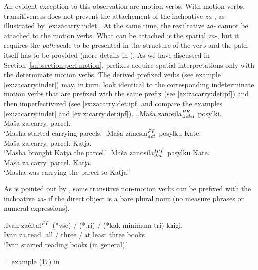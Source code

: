 An evident exception to this observation are motion verbs. With motion verbs, transitiveness does not prevent the attachement of the inchoative \textit{za-}, as illustrated by \ref{ex:zacarry:indet}. At the same time, the resultative \textit{za-} cannot be attached to the motion verbs. What can be attached is the spatial \textit{za-}, but it requires the \textit{path} scale to be presented in the structure of the verb and the path itself has to be provided (more details in \citealt{ZinovaOsswald:paper}). As we have discussed in Section~\ref{subsection:perf:motion}, prefixes acquire spatial interpretations only with the determinate motion verbs. The derived prefixed verbs (see example \ref{ex:zacarry:indet}) may, in turn, look identical to the corresponding indeterminate motion verbs that are prefixed with the same prefix (see \ref{ex:zacarry:det:pf}) and then imperfectivized (see \ref{ex:zacarry:det:ipf} and compare the examples \ref{ex:zacarry:indet} and \ref{ex:zacarry:det:ipf}).
 \ex.\label{ex:zacarry}\ag.\label{ex:zacarry:indet}Ma\v{s}a zanosila$^{\mathit{PF}}_{\mathit{indet}}$ posylki.\\
 Ma\v{s}a za.carry. parcel.\\
 \vspace{0.5em}
`Masha started carrying parcels.'
\bg.\label{ex:zacarry:det:pf}Ma\v{s}a zanesla$^{\mathit{PF}}_{\mathit{det}}$ posylku Kate.\\
 Ma\v{s}a za.carry. parcel. Katja.\\
 \vspace{0.5em}
`Masha brought Katja the parcel.'
\bg.\label{ex:zacarry:det:ipf}Ma\v{s}a zanosila$^{\mathit{IPF}}_{\mathit{det}}$ posylku Kate.\\
 Ma\v{s}a za.carry. parcel. Katja.\\
 \vspace{0.5em}
`Masha was carrying the parcel to Katja.'
 
As is pointed out by \citet[227]{Braginsky:08}, some transitive non-motion verbs can be prefixed with the inchoative \textit{za-} if the direct object is a bare plural noun (no measure phrases or numeral expressions).

\exg.Ivan za\v{c}ital$^{\mathit{PF}}$ (*vse) / (*tri) / (*kak minimum tri) knigi.\\
Ivan za.read. all / three / at least three books\\
\vspace{0.5em}
`Ivan started reading books (in general).'
\begin{flushright}
\vspace{-0.5em}
= example (17) in \citealt[227]{Braginsky:08}
\end{flushright}

